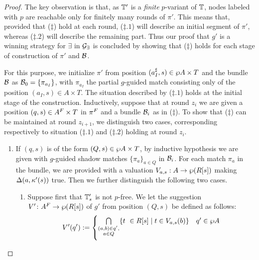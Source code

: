 \begin{proof}
The key observation is that, as $\mathbb{T}'$ is a \emph{finite} $p$-variant of $\mathbb{T}$, nodes labeled with $p$ are reachable only for finitely many rounds of $\pi'$. This means that, provided that ($\ddag$) hold at each round, ($\ddag.1$) will describe an initial segment of $\pi'$, whereas ($\ddag.2$) will describe the remaining part. Thus our proof that $g'$ is a winning strategy for $\exists$ in $\mathcal{G}_{\exists}$ is concluded by showing that ($\ddag$) holds for each stage of construction of $\pi'$ and $\mathcal{B}$.

For this purpose, we initialize $\pi'$ from position $(a_{I}^{\sharp},s) \in \wp A\times T$ and the bundle $\mathcal{B}$ as $\mathcal{B}_0 = \{\pi_{a_I}\}$, with $\pi_{a_I}$ the partial $g$-guided match consisting only of the position $(a_I,s)\in A\times T$. The situation described by ($\ddag .1$) holds at the initial stage of the construction.
Inductively, suppose that at round $z_i$ we are given a position $(q,s) \in A^{F} \times T$ in $\pi^{F}$ and a bundle $\mathcal{B}_i$ as in ($\ddag$). To show that ($\ddag$) can be maintained at round $z_{i+1}$, we distinguish two cases, corresponding respectively to situation ($\ddag.1$) and ($\ddag.2$) holding at round $z_i$.
\begin{enumerate}[label = (\Alph*), ref = \Alph*]
  \item If $(q,s)$ is of the form $(Q,s) \in \wp A \times T$, by inductive hypothesis we are given with $g$-guided shadow matches $\{\pi_a\}_{a \in Q}$ in $\mathcal{B}_i$. For each match $\pi_a$ in the bundle, we are provided with a valuation $V_{a,s}: A \rightarrow \wp (R[s])$ making $\Delta(a,\kappa'(s))$ true. Then we further distinguish the following two cases.
\begin{enumerate}[label = (\roman*), ref = \roman*]
  \item \label{point:TsNotPFree} Suppose first that $\mathbb{T}'_s$ is not $p$-free. We let the suggestion $V' \colon A^{F} \to \wp (R[s])$ of $g'$ from position $(Q,s)$ be defined as follows:
       \begin{align*}
       V'(q') \mathrel{:=} \begin{cases}
               \bigcap\limits_{\substack{(a,b) \in q',\\ a \in Q}}\{t\ \in R[s] \mid t \in V_{a,s}(b)\}               & q' \in \wp A \\[2em]

\end{cases}
\end{align*}
\end{enumerate}
\end{enumerate}
\end{proof}
